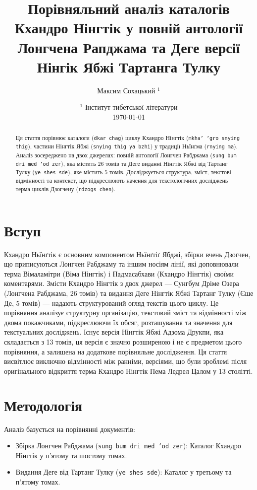 \documentclass{article}
\title{  Порівняльний аналіз каталогів Кхандро Нінгтік
         у повній антології Лонгчена Рапджама та
         Деге версії Нінгік Ябжі Тартанга Тулку}
\author{ Максим Сохацький $^1$ }
\date{   $^1$ Інститут тибетської літератури \\
         \today }
\begin{document}
\maketitle

\begin{abstract}
Ця стаття порівнює каталоги (\texttt{dkar chag}) циклу Кхандро Нінгтік (\texttt{mkha' 'gro snying thig}),
частини Нінгтік Ябжі (\texttt{snying thig ya bzhi}) у традиції Ньїнґма (\texttt{rnying ma}). Аналіз зосереджено на двох
джерелах: повній антології Лонгчен Рабджама (\texttt{sung bum dri med 'od zer}), яка містить 26 томів
та Деге виданні Нінгтік Ябжі від Тартанг Тулку (\texttt{ye shes sde}), яке містить 5 томів.
Досліджується структура, зміст, текстові відмінності та контекст, що підкреслюють
начення для текстологічних досліджень терма циклів Дзогчену (\texttt{rdzogs chen}).
\end{abstract}

\newpage
\tableofcontents

\newpage

\section{Вступ}

Кхандро Ньїнґтік є основним компонентом Ньїнґтіґ Ябджі, збірки вчень Дзоґчен,
що приписуються Лонгчен Рабджаму та іншим носіям лінії, які доповнювали терма
Вімаламітри (Віма Нінгтік) і Падмасабхави (Кхандро Нінгтік) своїми коментарями.
Змісти Кхандро Нінгтік з двох джерел — Сунгбум Дріме Озера (Лонгчена Рабджама, 26 томів) та видання
Деге Нінгтік Ябжі Тартанг Тулку (Єше Де, 5 томів) — надають структурований огляд текстів цього циклу.
Це порівняння аналізує структурну організацію, текстовий зміст та відмінності між
двома покажчиками, підкреслюючи їх обсяг, розташування та значення для текстуальних досліджень.
Існує версія Нінгтік Ябжі Адзома Друкпи, яка складається з 13 томів, ця версія є значно розширеною
і не є предметом цього порівняння, а залишена на додаткове порівняльне дослідження. Ця стаття
висвітлює виключно відмінності між ранніми, версіями, що були зроблемі після оригінального відкриття
терма Кхандро Нінгтік Пема Ледрел Цалом у 13 столітті.

\section{Методологія}
Аналіз базується на порівнянні документів:


\begingroup\raggedright
\begin{itemize}
    \item Збірка Лонгчен Рабджама (\texttt{sung bum dri med 'od zer}): Каталог Кхандро Нінгтік у п'ятому та шостому томах.
    \item Видання Деге від Тартанг Тулку (\texttt{ye shes sde}): Каталог у третьому та п'ятому томах.
\end{itemize}
\endgroup
\end{document}
